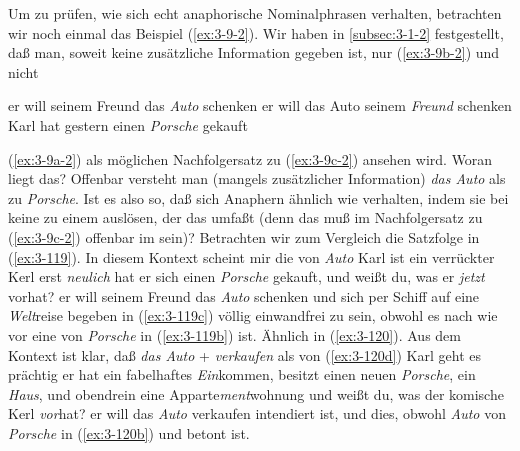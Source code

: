 \documentclass[output=paper]{langsci/langscibook}
\begin{document}
Um zu prüfen, wie sich echt anaphorische Nominalphrasen verhalten,
betrachten wir noch einmal das Beispiel (\ref{ex:3-9-2}). Wir haben in \ref{subsec:3-1-2} festgestellt, daß man, soweit keine zusätzliche Information
gegeben ist, nur (\ref{ex:3-9b-2}) und nicht 
\begin{exe}
\label{ex:3-9-2}
\begin{xlist}
\ex {}
\label{ex:3-9a-2}
er will seinem Freund das \textit{Auto} schenken
\ex {}
\label{ex:3-9b-2}
er will das Auto seinem \textit{Freund} schenken
\ex {}
\label{ex:3-9c-2}
Karl hat gestern einen \textit{Porsche} gekauft
\end{xlist}
\end{exe}
(\ref{ex:3-9a-2}) als möglichen Nachfolgersatz zu (\ref{ex:3-9c-2}) ansehen wird. Woran liegt das? Offenbar versteht man (mangels zusätzlicher Information) \textit{das Auto}
als  zu \textit{Porsche}. Ist es also so, daß sich Anaphern ähnlich wie  verhalten, indem sie bei  keine  zu einem  auslösen, der das  umfaßt (denn das  muß im Nachfolgersatz zu (\ref{ex:3-9c-2}) offenbar im  sein)? Betrachten wir zum Vergleich die Satzfolge in (\ref{ex:3-119}). In diesem Kontext scheint mir die  von \emph{Auto}
\eal
\label{ex:3-119}
\ex
\label{ex:3-119a}
Karl ist ein verrückter Kerl
\ex
\label{ex:3-119b}
erst \textit{neulich} hat er sich einen \textit{Porsche} gekauft, und
weißt du, was er \textit{jetzt} vorhat?  
\ex
\label{ex:3-119c}
er will seinem Freund das \textit{Auto} schenken und sich per Schiff auf eine
\textit{Welt}reise begeben
\zl
in (\ref{ex:3-119c}) völlig einwandfrei zu sein, obwohl es nach wie vor eine
 von \textit{Porsche} in (\ref{ex:3-119b}) ist. Ähnlich in (\ref{ex:3-120}). Aus dem
Kontext ist klar, daß \textit{das Auto} + \textit{verkaufen} als 
von (\ref{ex:3-120d})
\eal
\label{ex:3-120}
\ex
\label{ex:3-120a}
Karl geht es prächtig
\ex
\label{ex:3-120b}
er hat ein fabelhaftes \textit{Ein}kommen, besitzt einen neuen \textit{Porsche}, ein
\textit{Haus}, und obendrein eine Apparte\textit{ment}wohnung
\ex
\label{ex:3-120c}
und weißt du, was der komische Kerl \textit{vor}hat?
\ex
\label{ex:3-120d}
er will das \textit{Auto} verkaufen
\zl
intendiert ist, und dies, obwohl \textit{Auto}  von
\textit{Porsche} in (\ref{ex:3-120b}) und betont ist.
\end{document}
